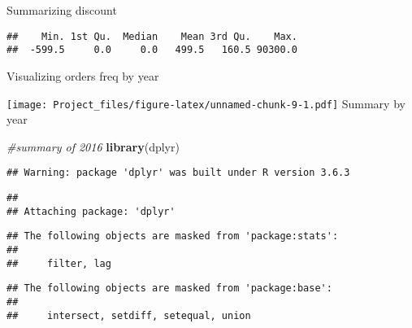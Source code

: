 \documentclass[
]{article}
\newenvironment{Shaded}{\begin{snugshade}}{\end{snugshade}}
\newcommand{\CommentTok}[1]{\textcolor[rgb]{0.56,0.35,0.01}{\textit{#1}}}
\newcommand{\KeywordTok}[1]{\textcolor[rgb]{0.13,0.29,0.53}{\textbf{#1}}}
\newcommand{\NormalTok}[1]{#1}
\newcommand{\OperatorTok}[1]{\textcolor[rgb]{0.81,0.36,0.00}{\textbf{#1}}}
\newcommand{\StringTok}[1]{\textcolor[rgb]{0.31,0.60,0.02}{#1}}
\begin{document}
Summarizing discount

\begin{Shaded}
\end{Shaded}

\begin{verbatim}
##    Min. 1st Qu.  Median    Mean 3rd Qu.    Max. 
##  -599.5     0.0     0.0   499.5   160.5 90300.0
\end{verbatim}

Visualizing orders freq by year

\begin{Shaded}
\end{Shaded}

\texttt{[image: Project\_files/figure-latex/unnamed-chunk-9-1.pdf]}
Summary by year

\begin{Shaded}
\begin{Highlighting}[]
\CommentTok{#summary of 2016}
\KeywordTok{library}\NormalTok{(dplyr)}
\end{Highlighting}
\end{Shaded}

\begin{verbatim}
## Warning: package 'dplyr' was built under R version 3.6.3
\end{verbatim}

\begin{verbatim}
## 
## Attaching package: 'dplyr'
\end{verbatim}

\begin{verbatim}
## The following objects are masked from 'package:stats':
## 
##     filter, lag
\end{verbatim}

\begin{verbatim}
## The following objects are masked from 'package:base':
## 
##     intersect, setdiff, setequal, union
\end{verbatim}
\end{document}
